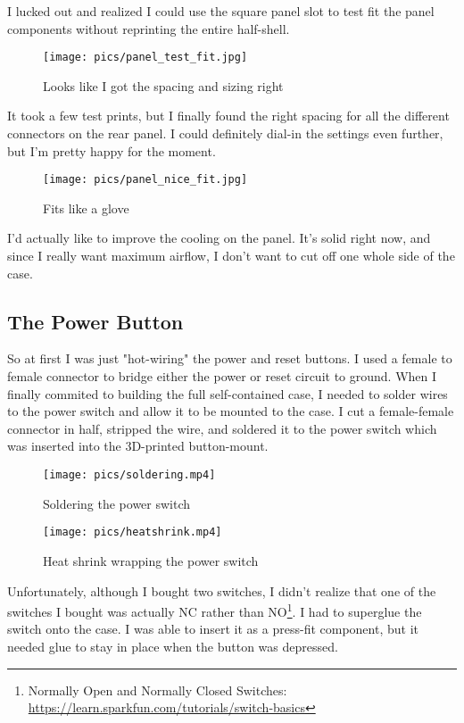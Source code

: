 \documentclass{article}
\begin{document}
I lucked out and realized I could use the square panel slot to test fit the panel components without reprinting the entire half-shell.

\begin{figure}[h]
\texttt{[image: pics/panel\_test\_fit.jpg]}
\caption{Looks like I got the spacing and sizing right}
\end{figure}

It took a few test prints, but I finally found the right spacing for all the different connectors on the rear panel. I could definitely dial-in the settings even further, but I'm pretty happy for the moment.

\begin{figure}[h]
\texttt{[image: pics/panel\_nice\_fit.jpg]}
\caption{Fits like a glove}
\end{figure}

I'd actually like to improve the cooling on the panel. It's solid right now, and since I really want maximum airflow, I don't want to cut off one whole side of the case.

\subsection{The Power Button}
So at first I was just "hot-wiring" the power and reset buttons. I used a female to female connector to bridge either the power or reset circuit to ground. When I finally commited to building the full self-contained case, I needed to solder wires to the power switch and allow it to be mounted to the case. I cut a female-female connector in half, stripped the wire, and soldered it to the power switch which was inserted into the 3D-printed button-mount.
\begin{figure}[h]
\texttt{[image: pics/soldering.mp4]}
\caption{Soldering the power switch}
\end{figure}

\begin{figure}[h]
\texttt{[image: pics/heatshrink.mp4]}
\caption{Heat shrink wrapping the power switch}
\end{figure}

Unfortunately, although I bought two switches, I didn't realize that one of the switches I bought was actually NC rather than NO\footnote{Normally Open and Normally Closed Switches: \url{https://learn.sparkfun.com/tutorials/switch-basics}}. I had to superglue the switch onto the case. I was able to insert it as a press-fit component, but it needed glue to stay in place when the button was depressed. 
\end{document}
